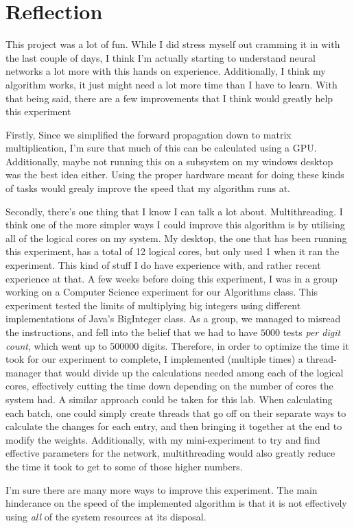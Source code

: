 \documentclass[10pt]{article}
\begin{document}
\section{Reflection}
This project was a lot of fun. While I did stress myself out cramming it in with the last couple of days, I think I'm actually starting to understand neural networks a lot more with this hands on experience. Additionally, I think my algorithm works, it just might need a lot more time than I have to learn. With that being said, there are a few improvements that I think would greatly help this experiment\par
Firstly, Since we simplified the forward propagation down to matrix multiplication, I'm sure that much of this can be calculated using a GPU. Additionally, maybe not running this on a subsystem on my windows desktop was the best idea either. Using the proper hardware meant for doing these kinds of tasks would grealy improve the speed that my algorithm runs at.\par
Secondly, there's one thing that I know I can talk a lot about. Multithreading. I think one of the more simpler ways I could improve this algorithm is by utilising all of the logical cores on my system. My desktop, the one that has been running this experiment, has a total of 12 logical cores, but only used 1 when it ran the experiment. This kind of stuff I do have experience with, and rather recent experience at that.\newline
A few weeks before doing this experiment, I was in a group working on a Computer Science experiment for our Algorithms class. This experiment tested the limits of multiplying big integers using different implementations of Java's BigInteger class. As a group, we managed to misread the instructions, and fell into the belief that we had to have $5000$ tests \textit{per digit count}, which went up to $500000$ digits. Therefore, in order to optimize the time it took for our experiment to complete, I implemented (multiple times) a thread-manager that would divide up the calculations needed among each of the logical cores, effectively cutting the time down depending on the number of cores the system had.\newline
A similar approach could be taken for this lab. When calculating each batch, one could simply create threads that go off on their separate ways to calculate the changes for each entry, and then bringing it together at the end to modify the weights. Additionally, with my mini-experiment to try and find effective parameters for the network, multithreading would also greatly reduce the time it took to get to some of those higher numbers.\par
I'm sure there are many more ways to improve this experiment. The main hinderance on the speed of the implemented algorithm is that it is not effectively using \textit{all} of the system resources at its disposal. 
\end{document}
